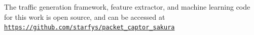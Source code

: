 The traffic generation framework, feature extractor, and machine learning code for this work is open source, and can be accessed at \href{https://github.com/starfys/packet_captor_sakura}{\texttt{https://github.com/starfys/packet\_captor\_sakura}}





